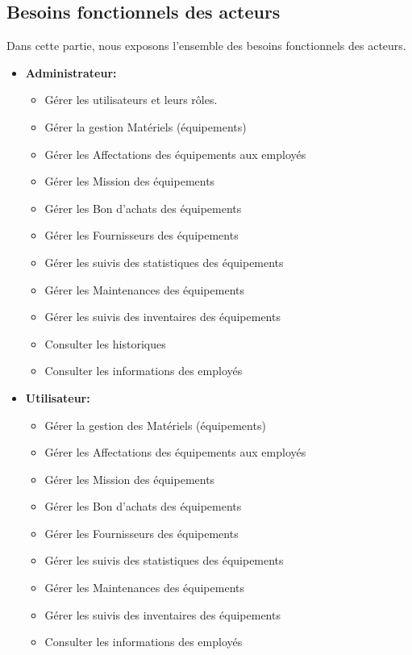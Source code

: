 \subsection{ Besoins fonctionnels des acteurs}
Dans cette partie, nous exposons l’ensemble des besoins fonctionnels des acteurs.
\begin{itemize}
    

   \item [$-$] \textbf{Administrateur:} 
    \begin{itemize}[label=\textbullet,font=\normalsize]
            \item Gérer les utilisateurs et leurs rôles.
            \item Gérer la gestion Matériels (équipements)
            \item Gérer les Affectations des équipements aux employés
            \item Gérer les Mission des équipements 
            \item Gérer les Bon d’achats des équipements
            \item Gérer les Fournisseurs des équipements
            \item Gérer les suivis des statistiques des équipements
            \item Gérer les Maintenances des équipements
            \item Gérer les suivis des inventaires des équipements
            \item Consulter les historiques
            \item Consulter les informations des employés
            \end{itemize}
    \newpage

    \item [$-$]\textbf{Utilisateur:}
            \begin{itemize}[label=\textbullet,font=\normalsize]
            \item Gérer la gestion des Matériels (équipements)
            \item Gérer les Affectations des équipements aux employés
            \item Gérer les Mission des équipements 
            \item Gérer les Bon d’achats des équipements
            \item Gérer les Fournisseurs des équipements
            \item Gérer les suivis des statistiques des équipements
            \item Gérer les Maintenances des équipements
            \item Gérer les suivis des inventaires des équipements
            \item Consulter les informations des employés
            \end{itemize}
\end{itemize}
   
